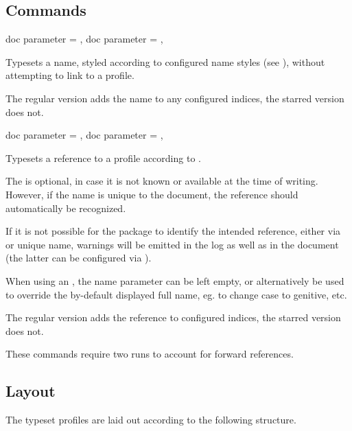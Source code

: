 \documentclass[
	a4paper,
]{article}
\begin{document}
\clearpage
\subsection{Commands} %

\begin{docCommands}[
		doc name = {gprName}
	]
	{
		{ doc parameter = {}},
		{ doc parameter = {\sarg{}}},
	}

	Typesets a name, styled according to configured name styles (see ), without attempting to link to a profile.

	The regular version adds the name to any configured indices, the starred version does not.
	
\end{docCommands}


\begin{docCommands}[
		doc name = {gprRef}
	]
	{
		{ doc parameter = {}},
		{ doc parameter = {\sarg{}}},
	}

	Typesets a reference to a profile according to .

	The  is optional, in case it is not known or available at the time of writing. However, if the name is unique to the document, the reference should automatically be recognized.

	If it is not possible for the package to identify the intended reference, either via  or unique name, warnings will be emitted in the log as well as in the document (the latter can be configured via ).

	When using an , the name parameter can be left empty, or alternatively be used to override the by-default displayed full name, eg. to change case to genitive, etc.

	The regular version adds the reference to configured indices, the starred version does not.

	These commands require two runs to account for forward references.
\end{docCommands}


\subsection{Layout} %

\label{sec:structure}
The typeset profiles are laid out according to the following structure.
\end{document}
